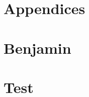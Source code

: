 
\newpage




\newpage
\pagestyle{empty}
\section*{Appendices}
\appendix
\section{Benjamin}
\section{Test}



